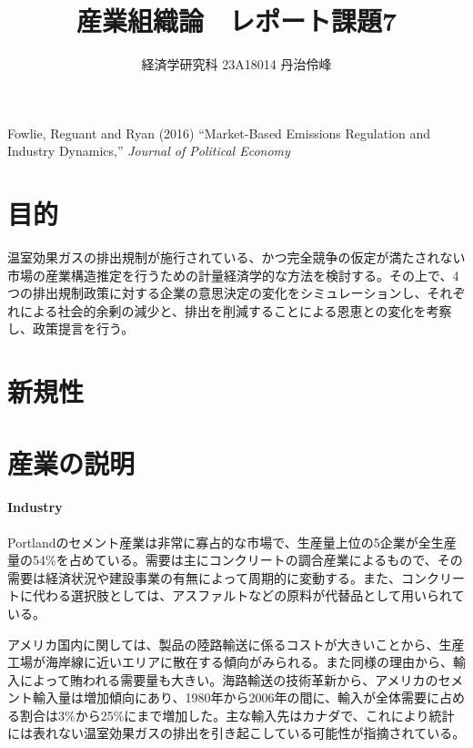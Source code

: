 \documentclass[11pt]{jsarticle}
\begin{document}
\title{産業組織論　レポート課題7}
\author{経済学研究科 23A18014 丹治伶峰}
\date{}
\maketitle

\large
Fowlie, Reguant and Ryan (2016) ``Market-Based Emissions Regulation and Industry Dynamics,'' \textit{Journal of Political Economy}

\normalsize

\section{目的}

温室効果ガスの排出規制が施行されている、かつ完全競争の仮定が満たされない市場の産業構造推定を行うための計量経済学的な方法を検討する。その上で、4つの排出規制政策に対する企業の意思決定の変化をシミュレーションし、それぞれによる社会的余剰の減少と、排出を削減することによる恩恵との変化を考察し、政策提言を行う。

\section{新規性}



\section{産業の説明}

\paragraph{Industry}

Portlandのセメント産業は非常に寡占的な市場で、生産量上位の5企業が全生産量の54\%を占めている。需要は主にコンクリートの調合産業によるもので、その需要は経済状況や建設事業の有無によって周期的に変動する。また、コンクリートに代わる選択肢としては、アスファルトなどの原料が代替品として用いられている。

アメリカ国内に関しては、製品の陸路輸送に係るコストが大きいことから、生産工場が海岸線に近いエリアに散在する傾向がみられる。また同様の理由から、輸入によって賄われる需要量も大きい。海路輸送の技術革新から、アメリカのセメント輸入量は増加傾向にあり、1980年から2006年の間に、輸入が全体需要に占める割合は3\%から25\%にまで増加した。主な輸入先はカナダで、これにより統計には表れない温室効果ガスの排出を引き起こしている可能性が指摘されている。
\end{document}
